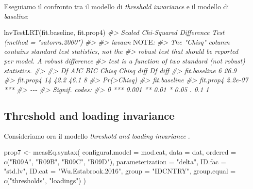 \documentclass[
  11pt,
]{krantz}
\makeatletter
\newenvironment{Shaded}{\begin{snugshade}}{\end{snugshade}}
\newcommand{\AlertTok}[1]{\textcolor[rgb]{0.33,0.33,0.33}{#1}}
\newcommand{\AttributeTok}[1]{\textcolor[rgb]{0.61,0.61,0.61}{#1}}
\newcommand{\CommentTok}[1]{\textcolor[rgb]{0.37,0.37,0.37}{\textit{#1}}}
\newcommand{\FunctionTok}[1]{\textcolor[rgb]{0,0,0}{#1}}
\newcommand{\NormalTok}[1]{#1}
\newcommand{\OtherTok}[1]{\textcolor[rgb]{0.37,0.37,0.37}{#1}}
\newcommand{\StringTok}[1]{\textcolor[rgb]{0.5,0.5,0.5}{#1}}
\newenvironment{kframe}{%
\medskip{}
\setlength{\fboxsep}{.8em}
 \def\at@end@of@kframe{}%
 \ifinner\ifhmode%
  \def\at@end@of@kframe{\end{minipage}}%
  \begin{minipage}{\columnwidth}%
 \fi\fi%
 \def\FrameCommand##1{\hskip\@totalleftmargin \hskip-\fboxsep
 \colorbox{shadecolor}{##1}\hskip-\fboxsep
     \hskip-\linewidth \hskip-\@totalleftmargin \hskip\columnwidth}%
 \MakeFramed {\advance\hsize-\width
   \@totalleftmargin\z@ \linewidth\hsize
   \@setminipage}}%
 {\par\unskip\endMakeFramed%
 \at@end@of@kframe}
\renewenvironment{Shaded}{\begin{kframe}}{\end{kframe}}
\theoremstyle{definition}
\theoremstyle{definition}
\theoremstyle{definition}
\theoremstyle{definition}
\theoremstyle{remark}
\makeatother
\begin{document}
Eseguiamo il confronto tra il modello di \emph{threshold invariance} e il modello di \emph{baseline}:

\begin{Shaded}
\begin{Highlighting}[]
\FunctionTok{lavTestLRT}\NormalTok{(fit.baseline, fit.prop4)}
\CommentTok{\#\textgreater{} Scaled Chi{-}Squared Difference Test (method = "satorra.2000")}
\CommentTok{\#\textgreater{} }
\CommentTok{\#\textgreater{} lavaan }\AlertTok{NOTE}\CommentTok{:}
\CommentTok{\#\textgreater{}     The "Chisq" column contains standard test statistics, not the}
\CommentTok{\#\textgreater{}     robust test that should be reported per model. A robust difference}
\CommentTok{\#\textgreater{}     test is a function of two standard (not robust) statistics.}
\CommentTok{\#\textgreater{}  }
\CommentTok{\#\textgreater{}              Df AIC BIC Chisq Chisq diff Df diff}
\CommentTok{\#\textgreater{} fit.baseline  6          26.9                   }
\CommentTok{\#\textgreater{} fit.prop4    14          42.2       46.1       8}
\CommentTok{\#\textgreater{}              Pr(\textgreater{}Chisq)    }
\CommentTok{\#\textgreater{} fit.baseline               }
\CommentTok{\#\textgreater{} fit.prop4       2.2e{-}07 ***}
\CommentTok{\#\textgreater{} {-}{-}{-}}
\CommentTok{\#\textgreater{} Signif. codes:  }
\CommentTok{\#\textgreater{} 0 \textquotesingle{}***\textquotesingle{} 0.001 \textquotesingle{}**\textquotesingle{} 0.01 \textquotesingle{}*\textquotesingle{} 0.05 \textquotesingle{}.\textquotesingle{} 0.1 \textquotesingle{} \textquotesingle{} 1}
\end{Highlighting}
\end{Shaded}

\hypertarget{threshold-and-loading-invariance}{%
\subsection{Threshold and loading invariance}\label{threshold-and-loading-invariance}}

Consideriamo ora il modello \emph{threshold and loading invariance} \citep[chiamato \emph{Proposition 7} da][]{wu2016identification}.

\begin{Shaded}
\begin{Highlighting}[]
\NormalTok{prop7 }\OtherTok{\textless{}{-}} \FunctionTok{measEq.syntax}\NormalTok{(}
  \AttributeTok{configural.model =}\NormalTok{ mod.cat,}
  \AttributeTok{data =}\NormalTok{ dat,}
  \AttributeTok{ordered =} \FunctionTok{c}\NormalTok{(}\StringTok{"R09A"}\NormalTok{, }\StringTok{"R09B"}\NormalTok{, }\StringTok{"R09C"}\NormalTok{, }\StringTok{"R09D"}\NormalTok{),}
  \AttributeTok{parameterization =} \StringTok{"delta"}\NormalTok{,}
  \AttributeTok{ID.fac =} \StringTok{"std.lv"}\NormalTok{,}
  \AttributeTok{ID.cat =} \StringTok{"Wu.Estabrook.2016"}\NormalTok{,}
  \AttributeTok{group =} \StringTok{"IDCNTRY"}\NormalTok{,}
  \AttributeTok{group.equal =} \FunctionTok{c}\NormalTok{(}\StringTok{"thresholds"}\NormalTok{, }\StringTok{"loadings"}\NormalTok{)}
\NormalTok{)}
\end{Highlighting}
\end{Shaded}
\end{document}

